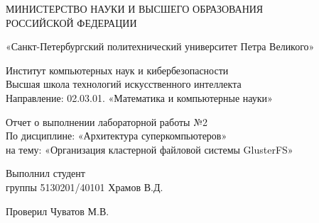     \begin{titlepage}
        \thispagestyle{empty}
        
        \begin{center}
        
            { \large МИНИСТЕРСТВО НАУКИ И ВЫСШЕГО ОБРАЗОВАНИЯ \\ 
                РОССИЙСКОЙ ФЕДЕРАЦИИ }
             
            { «Санкт-Петербургский политехнический университет Петра Великого» }
            
            { Институт компьютерных наук и кибербезопасности \\ 
                Высшая школа технологий искусственного интеллекта \\
                Направление: 02.03.01. «Математика и компьютерные науки» \\ }        
              
              \vspace{3cm}
            { \large Отчет о выполнении лабораторной работы №2 \\ 
              По дисциплине: «Архитектура суперкомпьютеров» \\ 
              на тему: «Организация кластерной файловой системы GlusterFS»
            }
    
        \end{center}
    
        \vspace{3cm}

        \begin{center}
            \noindent
            \begin{minipage}[t]{\textwidth}
                \raggedright Выполнил студент \\ группы 5130201/40101\hfill 
                \underline{\hspace{3cm}} Храмов В.Д.
            \end{minipage}
            
            \vspace{1cm}
            
            \noindent
            \begin{minipage}[t]{\textwidth}
                \raggedright Проверил  \hfill 
                \underline{\hspace{3cm}} Чуватов М.В.
            \end{minipage}
        \end{center}
        

\end{titlepage}
